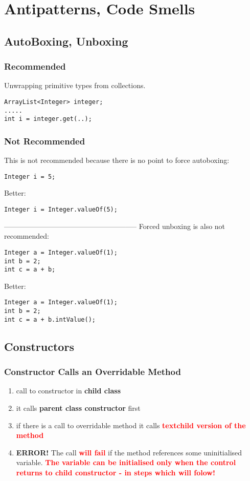 \documentclass{report}
\begin{document}
\part{Antipatterns, Code Smells}



\chapter{AutoBoxing, Unboxing}


\section*{Recommended}
Unwrapping primitive types from collections.
\begin{verbatim}
ArrayList<Integer> integer;
.....
int i = integer.get(..);

\end{verbatim}



\section*{Not Recommended}
This is not recommended because there is no point to force autoboxing:
\begin{verbatim}
Integer i = 5;
\end{verbatim}
Better:
\begin{verbatim}
Integer i = Integer.valueOf(5);
\end{verbatim}
--------------------------------------------------------
\newline
Forced unboxing is also not recommended:
\begin{verbatim}
Integer a = Integer.valueOf(1);
int b = 2;
int c = a + b;
\end{verbatim}
Better:
\begin{verbatim}
Integer a = Integer.valueOf(1);
int b = 2;
int c = a + b.intValue();
\end{verbatim}



\chapter{Constructors}


\section{Constructor Calls an Overridable Method}
\begin{enumerate}
	\item call to constructor in \textbf{child class}
	\item it calls \textbf{parent class constructor} first
	\item if there is a call to overridable method it calls \textcolor{red}{\textbf{textchild version of the method}}
	\item \textbf{ERROR! }The call \textcolor{red}{\textbf{will fail}} if the method references some uninitialised variable.
	\textcolor{red}{\textbf{The variable can be initialised only when the control returns to child constructor - in steps which will folow!}}
\end{enumerate}
\end{document}
